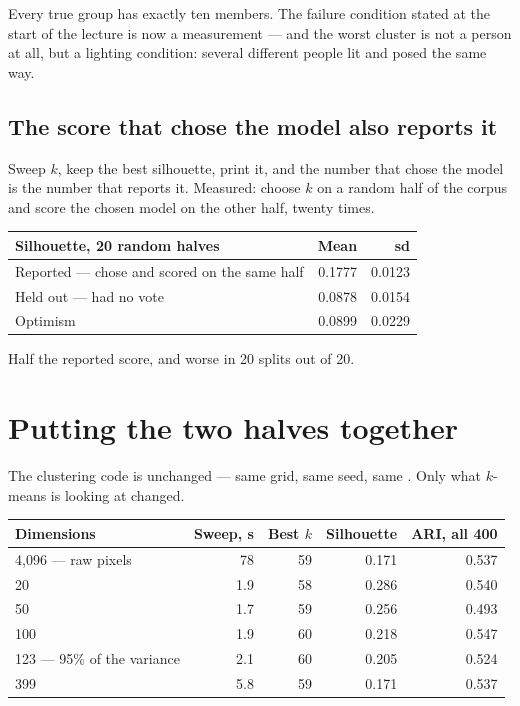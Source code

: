 \documentclass[11pt,a4paper]{article}
\begin{document}
Every true group has exactly ten members. The failure condition stated at the
start of the lecture is now a measurement --- and the worst cluster is not a
person at all, but a lighting condition: several different people lit and posed
the same way.

\subsection{The score that chose the model also reports it}

\begin{failbox}[title={Failure condition --- a bias that needs no labels to exist}]
Sweep $k$, keep the best silhouette, print it, and the number that chose the
model is the number that reports it. Measured: choose $k$ on a random half of
the corpus and score the chosen model on the other half, twenty times.

\begin{center}
\small
\begin{tabular}{lrr}
\toprule
\textbf{Silhouette, 20 random halves} & \textbf{Mean} & \textbf{sd} \\
\midrule
Reported --- chose and scored on the same half & 0.1777 & 0.0123 \\
Held out --- had no vote & 0.0878 & 0.0154 \\
Optimism & 0.0899 & 0.0229 \\
\bottomrule
\end{tabular}
\end{center}
Half the reported score, and worse in 20 splits out of 20.
\end{failbox}

\section{Putting the two halves together}

The clustering code is unchanged --- same grid, same seed, same
. Only what $k$-means is looking at changed.

\begin{center}
\small
\begin{tabular}{lrrrr}
\toprule
\textbf{Dimensions} & \textbf{Sweep, s} & \textbf{Best $k$} &
\textbf{Silhouette} & \textbf{ARI, all 400} \\
\midrule
4{,}096 --- raw pixels & 78 & 59 & 0.171 & 0.537 \\
20  & 1.9 & 58 & 0.286 & 0.540 \\
50  & 1.7 & 59 & 0.256 & 0.493 \\
100 & 1.9 & 60 & 0.218 & 0.547 \\
123 --- 95\% of the variance & 2.1 & 60 & 0.205 & 0.524 \\
399 & 5.8 & 59 & 0.171 & 0.537 \\
\bottomrule
\end{tabular}
\end{center}
\end{document}
